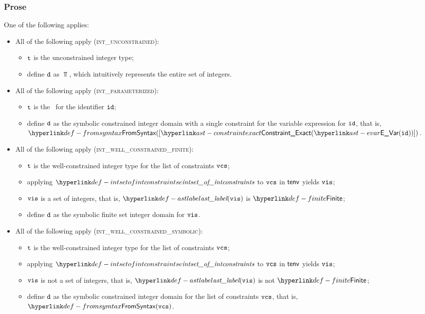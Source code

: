 \subsubsection{Prose}
One of the following applies:
\begin{itemize}
  \item All of the following apply (\textsc{int\_unconstrained}):
  \begin{itemize}
    \item $\texttt{t}$ is the unconstrained integer type;
    \item define $\texttt{d}$ as $\Top$, which intuitively represents the entire set of integers.
  \end{itemize}

  \item All of the following apply (\textsc{int\_parameterized}):
  \begin{itemize}
    \item $\texttt{t}$ is the \parameterizedintegertype\ for the identifier $\texttt{id}$;
    \item define $\texttt{d}$ as the symbolic constrained integer domain with a single constraint for the variable expression for $\texttt{id}$,
          that is, \\ $\FromSyntax([\ConstraintExact(\EVar(\id))])$.
  \end{itemize}

  \item All of the following apply (\textsc{int\_well\_constrained\_finite}):
  \begin{itemize}
    \item $\texttt{t}$ is the well-constrained integer type for the list of constraints $\texttt{vcs}$;
    \item applying $\intsetofintconstraints$ to $\texttt{vcs}$ in $\textsf{tenv}$ yields $\texttt{vis}$;
    \item $\texttt{vis}$ is a set of integers, that is, $\astlabel(\vis)$ is $\Finite$;
    \item define $\texttt{d}$ as the symbolic finite set integer domain for $\texttt{vis}$.
  \end{itemize}

  \item All of the following apply (\textsc{int\_well\_constrained\_symbolic}):
  \begin{itemize}
    \item $\texttt{t}$ is the well-constrained integer type for the list of constraints $\texttt{vcs}$;
    \item applying $\intsetofintconstraints$ to $\texttt{vcs}$ in $\textsf{tenv}$ yields $\texttt{vis}$;
    \item $\texttt{vis}$ is not a set of integers, that is, $\astlabel(\vis)$ is not $\Finite$;
    \item define $\texttt{d}$ as the symbolic constrained integer domain for the list of constraints $\texttt{vcs}$, that is, $\FromSyntax(\vcs)$.
  \end{itemize}


\end{itemize}
